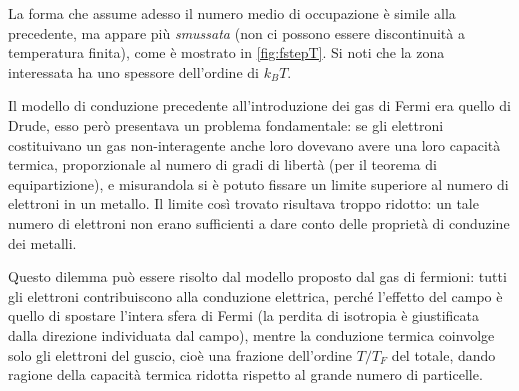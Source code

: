 La forma che assume adesso il numero medio di occupazione è simile alla precedente, ma appare più \textit{smussata} (non ci possono essere discontinuità a temperatura finita), come è mostrato in \cref{fig:fstepT}. 
Si noti che la zona interessata ha uno spessore dell'ordine di $k_B T$.
\newline

Il modello di conduzione precedente all'introduzione dei gas di Fermi era quello di Drude, esso però presentava un problema fondamentale: se gli elettroni costituivano un gas non-interagente anche loro dovevano avere una loro capacità termica, proporzionale al numero di gradi di libertà (per il teorema di equipartizione), e misurandola si è potuto fissare un limite superiore al numero di elettroni in un metallo. Il limite così trovato risultava troppo ridotto: un tale numero di elettroni non erano sufficienti a dare conto delle proprietà di conduzine dei metalli.

Questo dilemma può essere risolto dal modello proposto dal gas di fermioni: tutti gli elettroni contribuiscono alla conduzione elettrica, perché l'effetto del campo è quello di spostare l'intera sfera di Fermi (la perdita di isotropia è giustificata dalla direzione individuata dal campo), mentre la conduzione termica coinvolge solo gli elettroni del guscio, cioè una frazione dell'ordine $T/T_F$ del totale, dando ragione della capacità termica ridotta rispetto al grande numero di particelle.

